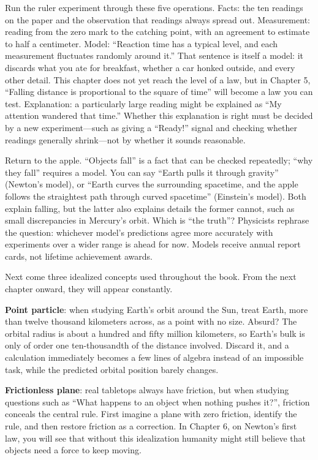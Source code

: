 Run the ruler experiment through these five operations. Facts: the ten readings on the paper and the observation that readings always spread out. Measurement: reading from the zero mark to the catching point, with an agreement to estimate to half a centimeter. Model: ``Reaction time has a typical level, and each measurement fluctuates randomly around it.'' That sentence is itself a model: it discards what you ate for breakfast, whether a car honked outside, and every other detail. This chapter does not yet reach the level of a law, but in Chapter 5, ``Falling distance is proportional to the square of time'' will become a law you can test. Explanation: a particularly large reading might be explained as ``My attention wandered that time.'' Whether this explanation is right must be decided by a new experiment---such as giving a ``Ready!'' signal and checking whether readings generally shrink---not by whether it sounds reasonable.

Return to the apple. ``Objects fall'' is a fact that can be checked repeatedly; ``why they fall'' requires a model. You can say ``Earth pulls it through gravity'' (Newton's model), or ``Earth curves the surrounding spacetime, and the apple follows the straightest path through curved spacetime'' (Einstein's model). Both explain falling, but the latter also explains details the former cannot, such as small discrepancies in Mercury's orbit. Which is ``the truth''? Physicists rephrase the question: whichever model's predictions agree more accurately with experiments over a wider range is ahead for now. Models receive annual report cards, not lifetime achievement awards.

Next come three idealized concepts used throughout the book. From the next chapter onward, they will appear constantly.

\textbf{Point particle}: when studying Earth's orbit around the Sun, treat Earth, more than twelve thousand kilometers across, as a point with no size. Absurd? The orbital radius is about a hundred and fifty million kilometers, so Earth's bulk is only of order one ten-thousandth of the distance involved. Discard it, and a calculation immediately becomes a few lines of algebra instead of an impossible task, while the predicted orbital position barely changes.

\textbf{Frictionless plane}: real tabletops always have friction, but when studying questions such as ``What happens to an object when nothing pushes it?'', friction conceals the central rule. First imagine a plane with zero friction, identify the rule, and then restore friction as a correction. In Chapter 6, on Newton's first law, you will see that without this idealization humanity might still believe that objects need a force to keep moving.

